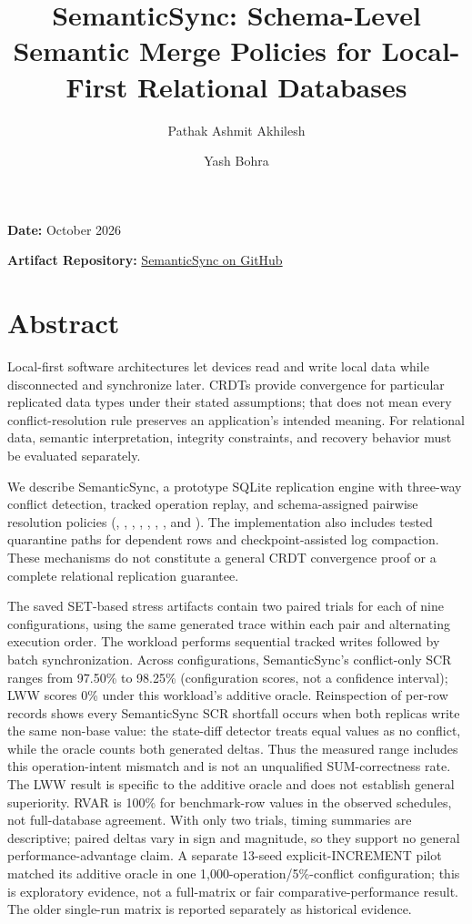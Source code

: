 \documentclass[runningheads]{llncs}
\title{SemanticSync: Schema-Level Semantic Merge Policies for Local-First Relational Databases}
\author{Pathak Ashmit Akhilesh\inst{1} \and Yash Bohra\inst{1}}
\institute{VIT Vellore (department and exact institutional style to be confirmed)}
\begin{document}
\maketitle
\noindent \textbf{Date:} October 2026  \par
\noindent \textbf{Artifact Repository:} \href{https://github.com/Ashmit-Pathak018/SymanticSync}{SemanticSync on GitHub}\par
\section{Abstract}
Local-first software architectures let devices read and write local data while disconnected and synchronize later. CRDTs provide convergence for particular replicated data types under their stated assumptions; that does not mean every conflict-resolution rule preserves an application's intended meaning. For relational data, semantic interpretation, integrity constraints, and recovery behavior must be evaluated separately.

We describe SemanticSync, a prototype SQLite replication engine with three-way conflict detection, tracked operation replay, and schema-assigned pairwise resolution policies (\texttt{}, \texttt{}, \texttt{}, \texttt{}, \texttt{}, \texttt{}, \texttt{}, and \texttt{}). The implementation also includes tested quarantine paths for dependent rows and checkpoint-assisted log compaction. These mechanisms do not constitute a general CRDT convergence proof or a complete relational replication guarantee.

The saved SET-based stress artifacts contain two paired trials for each of nine configurations, using the same generated trace within each pair and alternating execution order. The workload performs sequential tracked writes followed by batch synchronization. Across configurations, SemanticSync's conflict-only SCR ranges from 97.50\% to 98.25\% (configuration scores, not a confidence interval); LWW scores 0\% under this workload's additive oracle. Reinspection of per-row records shows every SemanticSync SCR shortfall occurs when both replicas write the same non-base value: the state-diff detector treats equal values as no conflict, while the oracle counts both generated deltas. Thus the measured range includes this operation-intent mismatch and is not an unqualified SUM-correctness rate. The LWW result is specific to the additive oracle and does not establish general superiority. RVAR is 100\% for benchmark-row values in the observed schedules, not full-database agreement. With only two trials, timing summaries are descriptive; paired deltas vary in sign and magnitude, so they support no general performance-advantage claim. A separate 13-seed explicit-INCREMENT pilot matched its additive oracle in one 1,000-operation/5\%-conflict configuration; this is exploratory evidence, not a full-matrix or fair comparative-performance result. The older single-run matrix is reported separately as historical evidence.
\end{document}

